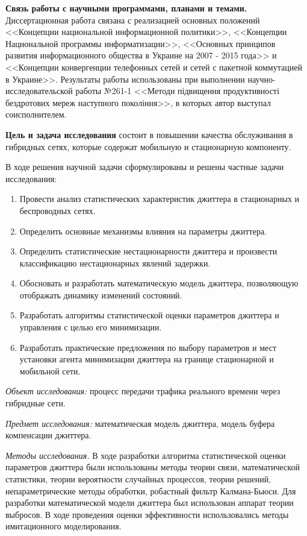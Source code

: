 \textbf{Связь работы с научными программами, планами и темами.} Диссертационная работа связана с реализацией основных положений <<Концепции национальной информационной политики>>, <<Концепции Национальной программы информатизации>>, <<Основных принципов развития информационного общества в Украине на 2007 - 2015 года>> и <<Концепции конвергенции телефонных сетей и сетей с пакетной коммутацией в Украине>>.
Результаты работы использованы при выполнении научно-исследовательской работы №261-1 <<Методи підвищення продуктивності бездротових мереж наступного покоління>>, в которых автор выступал соисполнителем.

\textbf{Цель и задача исследования} состоит в повышении качества обслуживания в гибридных сетях, которые содержат мобильную и стационарную компоненту.

В ходе решения научной задачи сформулированы и решены частные задачи исследования:
\begin{enumerate}
  \item Провести анализ статистических характеристик джиттера в стационарных и беспроводных сетях.
  \item Определить основные механизмы влияния на параметры джиттера.
  \item Определить статистические нестационарности джиттера и произвести классификацию нестационарных явлений задержки.
  \item Обосновать и разработать математическую модель джиттера, позволяющую отображать динамику изменений состояний.
  \item Разработать алгоритмы статистической оценки параметров джиттера и управления с целью его минимизации.
  \item Разработать практические предложения по выбору параметров и мест установки агента минимизации джиттера на границе стационарной и мобильной сети.
\end{enumerate}

{\itshape Объект исследования:} процесс передачи трафика реального времени через гибридные сети.

{\itshape Предмет исследования:} математическая модель джиттера, модель буфера компенсации джиттера.

{\itshape Методы исследования.} 
В ходе разработки алгоритма статистической оценки параметров джиттера были использованы методы теории связи, математической статистики, теории вероятности случайных процессов, 
теории решений, непараметрические методы обработки, робастный фильтр Калмана-Бьюси. 
Для разработки математической модели джиттера был использован аппарат теории выбросов. 
В ходе проведения оценки эффективности использовались методы имитационного моделирования.


